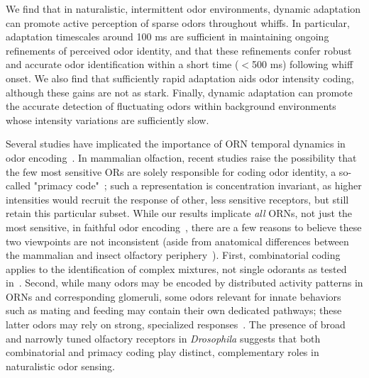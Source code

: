 We find that in naturalistic, intermittent odor environments, dynamic adaptation can promote active perception of sparse odors throughout whiffs. In particular, adaptation timescales around 100 ms are sufficient in maintaining ongoing refinements of perceived odor identity, and that these refinements confer robust and accurate odor identification within a short time ($<$500 ms) following whiff onset. We also find that sufficiently rapid adaptation aids odor intensity coding, although these gains are not as stark. Finally, dynamic adaptation can promote the accurate detection of fluctuating odors within background environments whose intensity variations are sufficiently slow. 


Several studies have implicated the importance of ORN temporal dynamics in odor encoding~\cite{multiple_timescales_stopfer, primacy_coding, olfactory_coding_latency, chih-ying, martelli, odor_coding_rate_verhagen, neural_network_temporal_coding, dweck}. In mammalian olfaction, recent studies raise the possibility that the few most sensitive ORs are solely responsible for coding odor identity, a so-called "primacy code"~\cite{primacy_coding}; such a representation is concentration invariant, as higher intensities would recruit the response of other, less sensitive receptors, but still retain this particular subset. While our results implicate \textit{all} ORNs, not just the most sensitive, in faithful odor encoding~\cite{vijay_1}, there are a few reasons to believe these two viewpoints are not inconsistent (aside from anatomical differences between the mammalian and insect olfactory periphery~\cite{mammalian_olfaction}). First, combinatorial coding applies to the identification of complex mixtures, not single odorants as tested in~\cite{primacy_coding}. Second, while many odors may be encoded by distributed activity patterns in ORNs and corresponding glomeruli, some odors relevant for innate behaviors such as mating and feeding may contain their own dedicated pathways; these latter odors may rely on strong, specialized responses~\cite{dweck, evolution_insect_olfaction}. The presence of broad and narrowly tuned olfactory receptors in \textit{Drosophila} suggests that both combinatorial and primacy coding play distinct, complementary roles in naturalistic odor sensing. 







